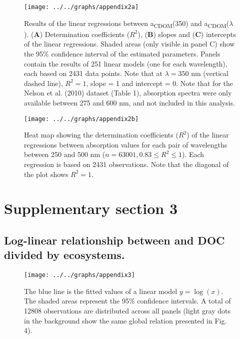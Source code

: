 \documentclass[12pt,a4paper]{scrartcl}
\begin{document}


\begin{figure}[h]
	\ContinuedFloat*
	\centering
	\texttt{[image: ../../graphs/appendix2a]}
	\caption{\label{first}Results of the linear regressions between a\textsubscript{CDOM}(350) and a\textsubscript{CDOM}($\lambda$). (\textbf{A}) Determination coefficients ($R^2$), (\textbf{B}) slopes and (\textbf{C}) intercepts of the linear regressions. Shaded areas (only visible in panel C) show the 95\% confidence interval of the estimated parameters. Panels contain the results of 251 linear models (one for each wavelength), each based on 2431 data points. Note that at $\lambda = 350$ nm (vertical dashed line), $R^2 = 1$, slope = 1 and intercept = 0. Note that for the Nelson et al. (2010) dataset (Table 1), absorption spectra were only available between 275 and 600 nm, and not included in this analysis.}
\end{figure}

\begin{figure}[h]
	\ContinuedFloat
	\centering
	\texttt{[image: ../../graphs/appendix2b]}
	\caption{\label{second}Heat map showing the determination coefficients ($R^2$) of the linear regressions between absorption values for each pair of wavelengths between 250 and 500 nm ($n = 63001, 0.83 \le R^2 \le 1$). Each regression is based on 2431 observations. Note that the diagonal of the plot shows $R^2 = 1$. }
\end{figure}

\clearpage
\newpage

\section*{Supplementary section 3}
\subsection*{Log-linear relationship between  and DOC divided by ecosystems.}

\begin{figure}[h]
	\centering
	\texttt{[image: ../../graphs/appendix3]}

	\caption{The blue line is the fitted values of a linear model $y = \log(x)$. The shaded areas represent the 95\% confidence intervals. A total of 12808 observations are distributed across all panels (light gray dots in the background show the same global relation presented in Fig. 4).}
\end{figure}
\end{document}
